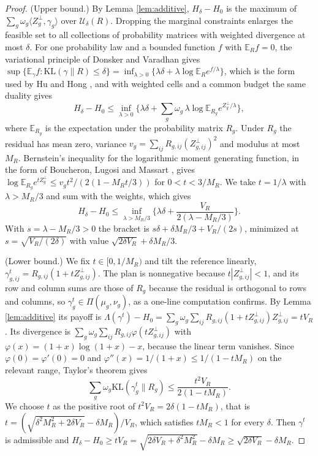 \documentclass[11pt,a4paper]{article}
\theoremstyle{notesplain}
\theoremstyle{notesupright}
\numberwithin{equation}{section}
\newcommand{\KL}{\mathrm{KL}}
\newcommand{\E}{\mathbb{E}}
\begin{document}
\begin{proof}
(Upper bound.) By Lemma \ref{lem:additive}, $H_\delta-H_0$ is the maximum of $\sum_g\omega_g\langle Z^\perp_g,\gamma_g\rangle$ over $\mathcal U_\delta(R)$. Dropping the marginal constraints enlarges the feasible set to all collections of probability matrices with weighted divergence at most $\delta$. For one probability law and a bounded function $f$ with $\E_Rf=0$, the variational principle of Donsker and Varadhan \cite{donskervaradhan} gives $\sup\{\E_\gamma f:\KL(\gamma\|R)\le\delta\}=\inf_{\lambda>0}\{\lambda\delta+\lambda\log\E_Re^{f/\lambda}\}$, which is the form used by Hu and Hong \cite{huhong}, and with weighted cells and a common budget the same duality gives
\begin{equation}
H_\delta-H_0\le\inf_{\lambda>0}\Big\{\lambda\delta+\sum_g\omega_g\,\lambda\log\E_{R_g}e^{Z^\perp_g/\lambda}\Big\},
\label{eq:dvbound}
\end{equation}
where $\E_{R_g}$ is the expectation under the probability matrix $R_g$. Under $R_g$ the residual has mean zero, variance $v_g=\sum_{ij}R_{g,ij}(Z^\perp_{g,ij})^2$ and modulus at most $M_R$. Bernstein's inequality for the logarithmic moment generating function, in the form of Boucheron, Lugosi and Massart \cite{blm}, gives $\log\E_{R_g}e^{tZ^\perp_g}\le v_gt^2/(2(1-M_Rt/3))$ for $0<t<3/M_R$. We take $t=1/\lambda$ with $\lambda>M_R/3$ and sum with the weights, which gives
\begin{equation}
H_\delta-H_0\le\inf_{\lambda>M_R/3}\Big\{\lambda\delta+\frac{V_R}{2(\lambda-M_R/3)}\Big\}.
\end{equation}
With $s=\lambda-M_R/3>0$ the bracket is $s\delta+\delta M_R/3+V_R/(2s)$, minimized at $s=\sqrt{V_R/(2\delta)}$ with value $\sqrt{2\delta V_R}+\delta M_R/3$.

(Lower bound.) We fix $t\in[0,1/M_R)$ and tilt the reference linearly, $\gamma^t_{g,ij}=R_{g,ij}(1+tZ^\perp_{g,ij})$. The plan is nonnegative because $t|Z^\perp_{g,ij}|<1$, and its row and column sums are those of $R_g$ because the residual is orthogonal to rows and columns, so $\gamma^t_g\in\Pi(\mu_g,\nu_g)$, as a one-line computation confirms. By Lemma \ref{lem:additive} its payoff is $\Lambda(\gamma^t)-H_0=\sum_g\omega_g\sum_{ij}R_{g,ij}(1+tZ^\perp_{g,ij})Z^\perp_{g,ij}=tV_R$. Its divergence is $\sum_g\omega_g\sum_{ij}R_{g,ij}\varphi(tZ^\perp_{g,ij})$ with $\varphi(x)=(1+x)\log(1+x)-x$, because the linear term vanishes. Since $\varphi(0)=\varphi'(0)=0$ and $\varphi''(x)=1/(1+x)\le1/(1-tM_R)$ on the relevant range, Taylor's theorem gives
\begin{equation}
\sum_g\omega_g\KL(\gamma^t_g\|R_g)\le\frac{t^2V_R}{2(1-tM_R)}.
\end{equation}
We choose $t$ as the positive root of $t^2V_R=2\delta(1-tM_R)$, that is $t=(\sqrt{\delta^2M_R^2+2\delta V_R}-\delta M_R)/V_R$, which satisfies $tM_R<1$ for every $\delta$. Then $\gamma^t$ is admissible and $H_\delta-H_0\ge tV_R=\sqrt{2\delta V_R+\delta^2M_R^2}-\delta M_R\ge\sqrt{2\delta V_R}-\delta M_R$.
\end{proof}
\end{document}

